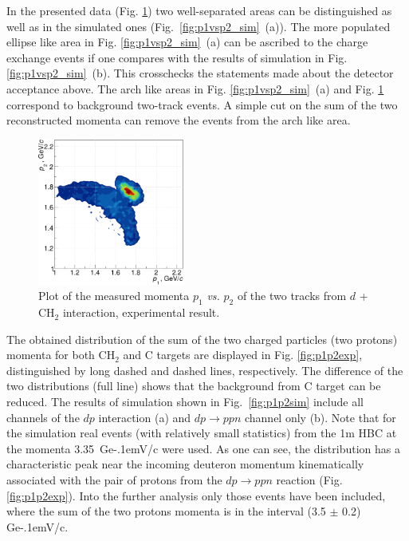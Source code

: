 \documentclass[twocolumn,epjc3]{svjour3}
\newcommand{\dpfrag} {\ensuremath{dp \rightarrow ppn}\xspace}
\newcommand{\GeVc}   {Ge\kern-.1emV/c\xspace}
\begin{document}
In the presented data (Fig. \ref{fig:p1vsp2_exp}) two well-separated areas can
be distinguished as well as in the simulated ones
(Fig.~\ref{fig:p1vsp2_sim}~(a)). The more populated ellipse like area in
Fig. \ref{fig:p1vsp2_sim}~(a) can be ascribed to the charge exchange events if
one compares with the results of simulation in
Fig. \ref{fig:p1vsp2_sim}~(b). This crosschecks the statements made about the
detector acceptance above. The arch like areas in Fig. \ref{fig:p1vsp2_sim}~(a)
and Fig. \ref{fig:p1vsp2_exp} correspond to background two-track events. A
simple cut on the sum of the two reconstructed momenta can remove the events
from the arch like area.

\begin{figure}[h]
  \centering
  \includegraphics[width=0.43\textwidth]{p1_vs_p2_2.pdf}
  \caption{Plot of the measured momenta $p_1$ \textit{vs.} $p_2$ of the two
    tracks from $d$ + CH$_{2}$ interaction, experimental result.}
  \label{fig:p1vsp2_exp}
\end{figure}

The obtained distribution of the sum of the two charged particles (two protons)
momenta for both CH$_2$ and C targets are displayed in Fig. \ref{fig:p1p2exp},
distinguished by long dashed and dashed lines, respectively. The difference of
the two distributions (full line) shows that the background from C target can be
reduced. The results of simulation shown in Fig.~\ref{fig:p1p2sim} include all
channels of the $dp$ interaction (a) and \dpfrag channel only (b). Note that for
the simulation real events (with relatively small statistics) from the 1m HBC at
the momenta 3.35~\GeVc were used. As one can see, the distribution has a
characteristic peak near the incoming deuteron momentum kinematically associated
with the pair of protons from the \dpfrag reaction (Fig. \ref{fig:p1p2exp}).
Into the further analysis only those events have been included, where the sum of
the two protons momenta is in the interval (3.5 $\pm$ 0.2) \GeVc.
\end{document}

